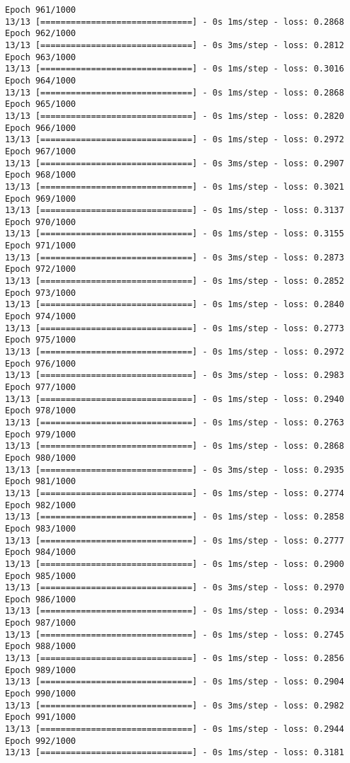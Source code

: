 \documentclass[11pt]{article}
\begin{document}
\begin{Verbatim}[commandchars=\\\{\}]
Epoch 961/1000
13/13 [==============================] - 0s 1ms/step - loss: 0.2868
Epoch 962/1000
13/13 [==============================] - 0s 3ms/step - loss: 0.2812
Epoch 963/1000
13/13 [==============================] - 0s 1ms/step - loss: 0.3016
Epoch 964/1000
13/13 [==============================] - 0s 1ms/step - loss: 0.2868
Epoch 965/1000
13/13 [==============================] - 0s 1ms/step - loss: 0.2820
Epoch 966/1000
13/13 [==============================] - 0s 1ms/step - loss: 0.2972
Epoch 967/1000
13/13 [==============================] - 0s 3ms/step - loss: 0.2907
Epoch 968/1000
13/13 [==============================] - 0s 1ms/step - loss: 0.3021
Epoch 969/1000
13/13 [==============================] - 0s 1ms/step - loss: 0.3137
Epoch 970/1000
13/13 [==============================] - 0s 1ms/step - loss: 0.3155
Epoch 971/1000
13/13 [==============================] - 0s 3ms/step - loss: 0.2873
Epoch 972/1000
13/13 [==============================] - 0s 1ms/step - loss: 0.2852
Epoch 973/1000
13/13 [==============================] - 0s 1ms/step - loss: 0.2840
Epoch 974/1000
13/13 [==============================] - 0s 1ms/step - loss: 0.2773
Epoch 975/1000
13/13 [==============================] - 0s 1ms/step - loss: 0.2972
Epoch 976/1000
13/13 [==============================] - 0s 3ms/step - loss: 0.2983
Epoch 977/1000
13/13 [==============================] - 0s 1ms/step - loss: 0.2940
Epoch 978/1000
13/13 [==============================] - 0s 1ms/step - loss: 0.2763
Epoch 979/1000
13/13 [==============================] - 0s 1ms/step - loss: 0.2868
Epoch 980/1000
13/13 [==============================] - 0s 3ms/step - loss: 0.2935
Epoch 981/1000
13/13 [==============================] - 0s 1ms/step - loss: 0.2774
Epoch 982/1000
13/13 [==============================] - 0s 1ms/step - loss: 0.2858
Epoch 983/1000
13/13 [==============================] - 0s 1ms/step - loss: 0.2777
Epoch 984/1000
13/13 [==============================] - 0s 1ms/step - loss: 0.2900
Epoch 985/1000
13/13 [==============================] - 0s 3ms/step - loss: 0.2970
Epoch 986/1000
13/13 [==============================] - 0s 1ms/step - loss: 0.2934
Epoch 987/1000
13/13 [==============================] - 0s 1ms/step - loss: 0.2745
Epoch 988/1000
13/13 [==============================] - 0s 1ms/step - loss: 0.2856
Epoch 989/1000
13/13 [==============================] - 0s 1ms/step - loss: 0.2904
Epoch 990/1000
13/13 [==============================] - 0s 3ms/step - loss: 0.2982
Epoch 991/1000
13/13 [==============================] - 0s 1ms/step - loss: 0.2944
Epoch 992/1000
13/13 [==============================] - 0s 1ms/step - loss: 0.3181

\end{Verbatim}
\end{document}
